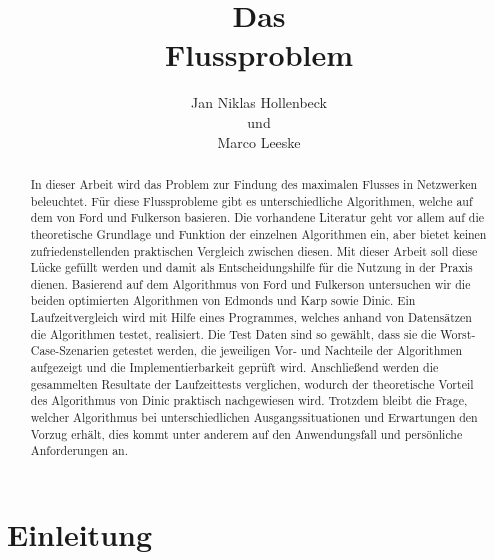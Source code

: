 \documentclass[a4paper]{llncs}
\begin{document}
\mainmatter  %

\title{Das \\ Flussproblem}


%
%
\author{Jan Niklas Hollenbeck \\ und \\ Marco Leeske}
\maketitle


\begin{abstract}
In dieser Arbeit wird das Problem zur Findung des maximalen
Flusses in Netzwerken beleuchtet.
Für diese Flussprobleme gibt es unterschiedliche Algorithmen, welche auf dem von Ford und Fulkerson basieren.
 Die vorhandene Literatur geht vor allem auf die theoretische Grundlage und Funktion der einzelnen Algorithmen ein,  aber bietet keinen zufriedenstellenden praktischen Vergleich zwischen diesen.
 Mit dieser Arbeit soll diese Lücke gefüllt werden und damit als Entscheidungshilfe für die Nutzung in der Praxis dienen.
Basierend auf dem Algorithmus von Ford und Fulkerson untersuchen wir die beiden optimierten Algorithmen von Edmonds und Karp sowie Dinic.
Ein Laufzeitvergleich wird mit Hilfe eines Programmes, welches anhand von Datensätzen die Algorithmen testet, realisiert.
Die Test Daten sind so gewählt, dass sie die Worst-Case-Szenarien getestet werden, die jeweiligen Vor- und Nachteile der Algorithmen aufgezeigt und die Implementierbarkeit geprüft wird.
Anschließend werden die gesammelten Resultate der Laufzeittests verglichen,
wodurch der theoretische Vorteil des Algorithmus von Dinic praktisch nachgewiesen wird.
 Trotzdem bleibt die Frage, welcher Algorithmus bei unterschiedlichen Ausgangssituationen und Erwartungen den Vorzug erhält, dies kommt unter anderem auf den Anwendungsfall und persönliche Anforderungen an.

\end{abstract}


\section{Einleitung}
\label{Einleitung}
\end{document}
